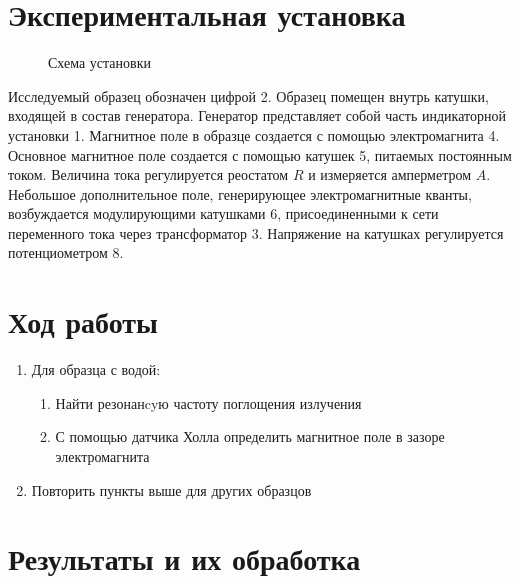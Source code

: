 \documentclass[12pt,a4paper]{article}
\begin{document}
\section{Экспериментальная установка}

\begin{figure}[ht!]
\caption{Схема установки}
\end{figure}

Исследуемый образец обозначен цифрой 2. Образец помещен внутрь катушки, входящей в состав генератора. Генератор представляет собой часть индикаторной установки 1. Магнитное поле в образце создается с помощью электромагнита 4. Основное магнитное поле создается с помощью катушек 5, питаемых постоянным током. Величина тока регулируется реостатом $R$ и измеряется амперметром $A$. Небольшое дополнительное поле, генерирующее электромагнитные кванты, возбуждается модулирующими катушками 6, присоединенными к сети переменного тока через трансформатор 3. Напряжение на катушках регулируется потенциометром 8.

\section{Ход работы}

\begin{enumerate}
	\item Для образца с водой:
	\begin{enumerate}
		\item Найти резонанcyю частоту поглощения излучения
		\item С помощью датчика Холла определить магнитное поле в зазоре электромагнита
	\end{enumerate}
	\item Повторить пункты выше для других образцов
\end{enumerate}

\section{Результаты и их обработка}
\end{document}
